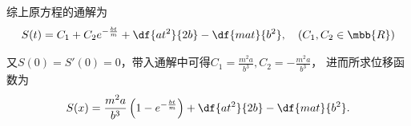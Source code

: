 \begin{frame}
	\linespread{1.5}
	
	\small \it
	
	综上原方程的通解为
	$$S(t)=C_1+C_2e^{-\frac{bt}m}+\df{at^2}{2b}-\df{mat}{b^2},
	\quad (C_1,C_2\in\mbb{R})$$
	
	又$S(0)=S'(0)=0$，带入通解中可得$C_1=\frac{m^2a}{b^3},C_2=-\frac{m^2a}{b^3}$，
	进而所求位移函数为
	$$S(x)=\frac{m^2a}{b^3}\left(1-e^{-\frac{bt}m}\right)
	+\df{at^2}{2b}-\df{mat}{b^2}.$$
	\fin
\end{frame}


% 	
% 	
